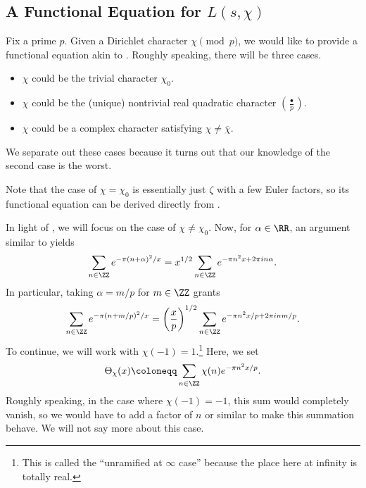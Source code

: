 \documentclass[../notes.tex]{subfiles}
\begin{document}
\subsection{A Functional Equation for \texorpdfstring{$L(s,\chi)$}{ L(s, chi)}}
Fix a prime $p$. Given a Dirichlet character $\chi\pmod p$, we would like to provide a functional equation akin to . Roughly speaking, there will be three cases.
\begin{itemize}
	\item $\chi$ could be the trivial character $\chi_0$.
	\item $\chi$ could be the (unique) nontrivial real quadratic character $\left(\frac\bullet p\right)$.
	\item $\chi$ could be a complex character satisfying $\chi\ne\overline\chi$.
\end{itemize}
We separate out these cases because it turns out that our knowledge of the second case is the worst.
\begin{remark} \label{rem:trivial-character-func-eq}
	Note that the case of $\chi=\chi_0$ is essentially just $\zeta$ with a few Euler factors, so its functional equation can be derived directly from .
\end{remark}
In light of , we will focus on the case of $\chi\ne\chi_0$. Now, for $\alpha\in\RR$, an argument similar to  yields
\[\sum_{n\in\ZZ}e^{-\pi(n+\alpha)^2/x}=x^{1/2}\sum_{n\in\ZZ}e^{-\pi n^2x+2\pi in\alpha}.\]
In particular, taking $\alpha=m/p$ for $m\in\ZZ$ grants
\[\sum_{n\in\ZZ}e^{-\pi(n+m/p)^2/x}=\left(\frac xp\right)^{1/2}\sum_{n\in\ZZ}e^{-\pi n^2x/p+2\pi inm/p}.\]
To continue, we will work with $\chi(-1)=1$.\footnote{This is called the ``unramified at $\infty$ case'' because the place here at infinity is totally real.} Here, we set
\[\Theta_\chi(x)\coloneqq\sum_{n\in\ZZ}\chi(n)e^{-\pi n^2x/p}.\]
Roughly speaking, in the case where $\chi(-1)=-1$, this sum would completely vanish, so we would have to add a factor of $n$ or similar to make this summation behave. We will not say more about this case.
\end{document}
